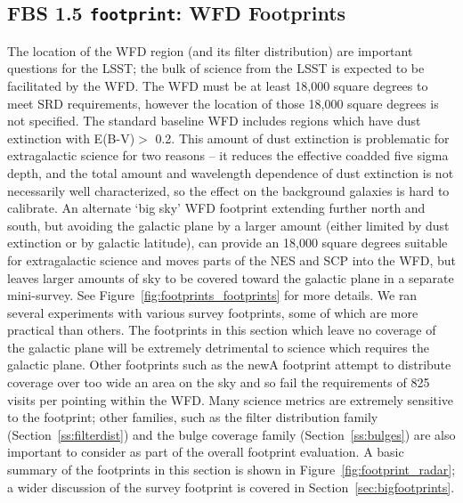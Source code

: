 \subsection{FBS 1.5 {\tt footprint}: WFD Footprints}\label{ss:footprints}

The location of the WFD region (and its filter distribution) are important questions for the LSST; the bulk of science from the LSST is expected to be facilitated by the WFD. The WFD must be at least 18,000 square degrees to meet SRD requirements, however the location of those 18,000 square degrees is not specified. The standard baseline WFD includes regions which have dust extinction with E(B-V)$>$ 0.2. This amount of dust extinction is problematic for extragalactic science for two reasons --  it reduces the effective coadded five sigma depth, and the total amount and wavelength dependence of dust extinction is not necessarily well characterized, so the effect on the background galaxies is hard to calibrate. An alternate `big sky' WFD footprint extending further north and south, but avoiding the galactic plane by a larger amount (either limited by dust extinction or by galactic latitude), can provide an 18,000 square degrees suitable for extragalactic science and moves parts of the NES and SCP into the WFD, but leaves larger amounts of sky to be covered toward the galactic plane in a separate mini-survey. See Figure~\ref{fig:footprints_footprints} for more details. We ran several experiments with various survey footprints, some of which are more practical than others. The footprints in this section which leave no coverage of the galactic plane will be extremely detrimental to science which requires the galactic plane. Other footprints such as the newA footprint attempt to distribute coverage over too wide an area on the sky and so fail the requirements of 825 visits per pointing within the WFD. Many science metrics are extremely sensitive to the footprint; other families, such as the filter distribution family (Section~\ref{ss:filterdist}) and the bulge coverage family (Section~\ref{ss:bulges}) are also important to consider as part of the overall footprint evaluation. A basic summary of the footprints in this section is shown in Figure~\ref{fig:footprint_radar}; a wider discussion of the survey footprint is covered in Section~\ref{sec:bigfootprints}. 

